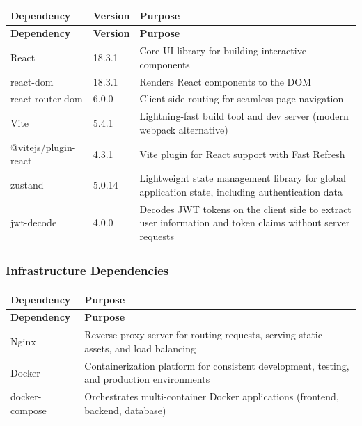 \documentclass[12pt, a4paper]{article}
\begin{document}
\begin{longtable}{L{3.6cm} C{2.0cm} L{8.8cm}}
  \color{white}\bfseries Dependency &
  \color{white}\bfseries Version &
  \color{white}\bfseries Purpose \\
  \endfirsthead
  \color{white}\bfseries Dependency &
  \color{white}\bfseries Version &
  \color{white}\bfseries Purpose \\
  \endhead
  React & 18.3.1 & Core UI library for building interactive components \\
  react-dom & 18.3.1 & Renders React components to the DOM \\
  react-router-dom & 6.0.0 & Client-side routing for seamless page navigation \\
  Vite & 5.4.1 & Lightning-fast build tool and dev server (modern webpack alternative) \\
  @vitejs/plugin-react & 4.3.1 & Vite plugin for React support with Fast Refresh \\
  zustand & 5.0.14 & Lightweight state management library for global application state, including authentication data \\
  jwt-decode & 4.0.0 & Decodes JWT tokens on the client side to extract user information and token claims without server requests \\
\end{longtable}

\subsubsection{Infrastructure Dependencies}

\begin{longtable}{L{3.6cm} L{10.8cm}}
  \color{white}\bfseries Dependency &
  \color{white}\bfseries Purpose \\
  \endfirsthead
  \color{white}\bfseries Dependency &
  \color{white}\bfseries Purpose \\
  \endhead
  Nginx & Reverse proxy server for routing requests, serving static assets, and load balancing \\
  Docker & Containerization platform for consistent development, testing, and production environments \\
  docker-compose & Orchestrates multi-container Docker applications (frontend, backend, database) \\
\end{longtable}
\end{document}
